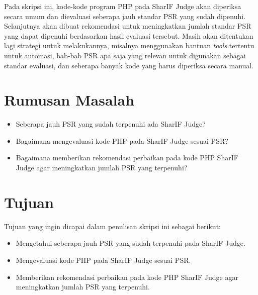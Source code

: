 \documentclass[a4paper,twoside]{article}
\begin{document}
Pada skripsi ini, kode-kode program PHP pada SharIF Judge akan diperiksa secara umum dan dievaluasi seberapa jauh standar PSR yang sudah dipenuhi. Selanjutnya akan dibuat rekomendasi untuk meningkatkan jumlah standar PSR yang dapat dipenuhi berdasarkan hasil evaluasi tersebut. Masih akan ditentukan lagi strategi untuk melakukannya, misalnya menggunakan bantuan \textit{tools} tertentu untuk automasi, bab-bab PSR apa saja yang relevan untuk digunakan sebagai standar evaluasi, dan seberapa banyak kode yang harus diperiksa secara manual. 
\section{Rumusan Masalah}
\begin{itemize}
	\item Seberapa jauh PSR yang sudah terpenuhi ada SharIF Judge?
	\item Bagaimana mengevaluasi kode PHP pada SharIF Judge sesuai PSR?  
	\item Bagaimana memberikan rekomendasi perbaikan pada kode PHP SharIF Judge agar meningkatkan jumlah PSR yang terpenuhi?
\end{itemize}

\section{Tujuan}
Tujuan yang ingin dicapai dalam penulisan skripsi ini sebagai berikut:
\begin{itemize}
	\item Mengetahui seberapa jauh PSR yang sudah terpenuhi pada SharIF Judge.
	\item Mengevaluasi kode PHP pada SharIF Judge sesuai PSR.
	\item Memberikan rekomendasi perbaikan pada kode PHP SharIF Judge agar meningkatkan jumlah PSR yang terpenuhi.
\end{itemize}
\end{document}
